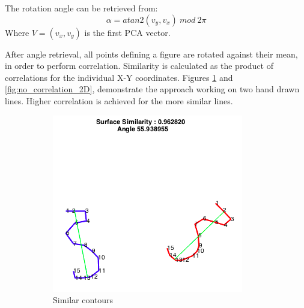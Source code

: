 \documentclass[
    floatsintext
]{article}
\begin{document}
The rotation angle can be retrieved from:
\begin{equation*}
\alpha = atan2(v_y,v_x)\ mod\ 2\pi 
\end{equation*}
Where $V=(v_x,v_y)$ is the first PCA vector.

After angle retrieval, all points defining a figure are rotated against their mean, in order to perform correlation. 
Similarity is calculated as the product of correlations for the individual X-Y coordinates.
Figures \ref{fig:correlation_2D} and \ref{fig:no_correlation_2D}, demonstrate the approach working on two hand drawn lines. 
Higher correlation is achieved for the more similar lines. 

\begin{figure}[h]
  \centering
  \begin{subfigure}{.5\textwidth}
    \includegraphics[width=1\linewidth]{./figures/correlation_2D.png}
    \caption{Similar contours}
    \label{fig:correlation_2D}
  \end{subfigure}
  \begin{subfigure}{.44\textwidth}

\end{subfigure}
\end{figure}
\end{document}
